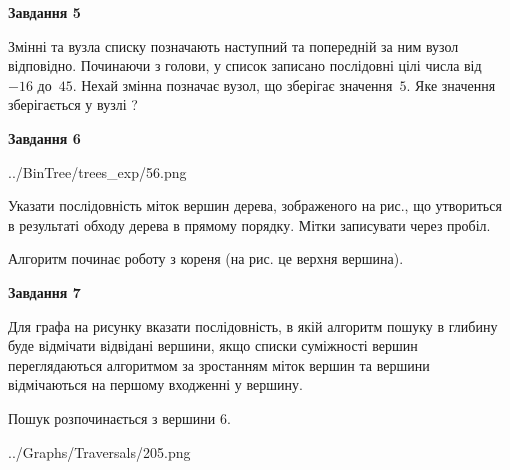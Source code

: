 \documentclass[12pt, ukrainian]{article}
\begin{document}
{\begin {large}
{\begin {center}\textbf{Завдання 5}\end {center}}\par
Змінні  та  вузла списку позначають наступний та попередній за ним вузол відповідно. Починаючи з голови, у список записано послідовні цілі числа від~$-16$ до~$45$. Нехай змінна  позначає вузол, що зберігає значення~$5$.
Яке значення зберігається у вузлі  ?\par
\newpage

{\begin {center}\textbf{Завдання 6}\end {center}}\par

\begin{center}
	{../BinTree/trees_exp/56.png}
\end{center}
Указати послідовність міток вершин дерева, зображеного на рис., що утвориться в результаті обходу дерева в прямому порядку. Мітки записувати через пробіл.\par Алгоритм починає роботу з кореня (на рис. це верхня вершина).\par
\newpage

{\begin {center}\textbf{Завдання 7}\end {center}}\par
Для графа на рисунку вказати послідовність, в якій алгоритм пошуку в глибину буде відмічати відвідані вершини, якщо списки суміжності вершин переглядаються алгоритмом за зростанням міток вершин та вершини відмічаються на першому вход\-женні у вершину.\par
Пошук розпочинається з вершини 6.\par

\begin{center}
	{../Graphs/Traversals/205.png}
\end{center}\par
\newpage


\end{large}}
\end{document}
